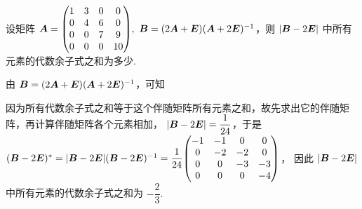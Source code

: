 \begin{example}
    设矩阵 $\vb*{A}=\mqty(1&3&0&0\\0&4&6&0\\0&0&7&9\\0&0&0&10),~\vb*{B}=(2\vb*{A}+\vb*{E})(\vb*{A}+2\vb*{E})^{-1}$，则 $|\vb*{B}-2\vb*{E}|$ 中所有元素的代数余子式之和为多少.
\end{example}
\begin{solution}
    由 $\vb*{B}=(2\vb*{A}+\vb*{E})(\vb*{A}+2\vb*{E})^{-1}$，可知
    因为所有代数余子式之和等于这个伴随矩阵所有元素之和，故先求出它的伴随矩阵，再计算伴随矩阵各个元素相加，
    $|\vb*{B}-2\vb*{E}|=\dfrac{1}{24}$，于是
    $(\vb*{B}-2\vb*{E})^*=|\vb*{B}-2\vb*{E}|(\vb*{B}-2\vb*{E})^{-1}=\dfrac{1}{24}\mqty(-1&-1&0&0\\0&-2&-2&0\\0&0&-3&-3\\0&0&0&-4)$，
    因此 $|\vb*{B}-2\vb*{E}|$ 中所有元素的代数余子式之和为 $-\dfrac{2}{3}.$
\end{solution}

